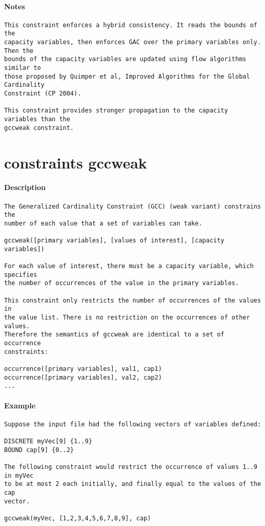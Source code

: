 \paragraph{Notes}
{\footnotesize
\begin{verbatim}
This constraint enforces a hybrid consistency. It reads the bounds of the
capacity variables, then enforces GAC over the primary variables only.  Then the
bounds of the capacity variables are updated using flow algorithms similar to
those proposed by Quimper et al, Improved Algorithms for the Global Cardinality
Constraint (CP 2004).

This constraint provides stronger propagation to the capacity variables than the
gccweak constraint.
\end{verbatim}
}
\section{constraints gccweak}
\paragraph{Description}
{\footnotesize
\begin{verbatim}
The Generalized Cardinality Constraint (GCC) (weak variant) constrains the 
number of each value that a set of variables can take.

gccweak([primary variables], [values of interest], [capacity variables])

For each value of interest, there must be a capacity variable, which specifies
the number of occurrences of the value in the primary variables.

This constraint only restricts the number of occurrences of the values in
the value list. There is no restriction on the occurrences of other values.
Therefore the semantics of gccweak are identical to a set of occurrence 
constraints:

occurrence([primary variables], val1, cap1)
occurrence([primary variables], val2, cap2)
...
\end{verbatim}
}
\paragraph{Example}
{\footnotesize
\begin{verbatim}
Suppose the input file had the following vectors of variables defined:

DISCRETE myVec[9] {1..9}
BOUND cap[9] {0..2}

The following constraint would restrict the occurrence of values 1..9 in myVec
to be at most 2 each initially, and finally equal to the values of the cap
vector.

gccweak(myVec, [1,2,3,4,5,6,7,8,9], cap)
\end{verbatim}
}
